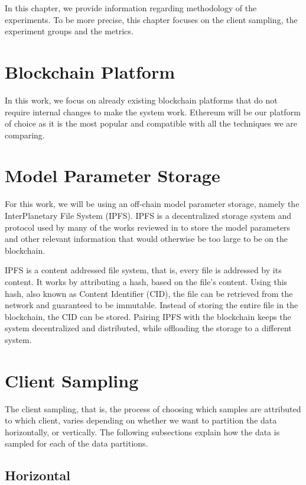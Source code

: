 In this chapter, we provide information regarding methodology of the experiments. To be more precise, this chapter focuses on the client sampling, the experiment groups and the metrics.

\section{Blockchain Platform}

In this work, we focus on already existing blockchain platforms that do not require internal changes to make the system work. Ethereum will be our platform of choice as it is the most popular and compatible with all the techniques we are comparing.

\section{Model Parameter Storage}\label{background:ipfs}

For this work, we will be using an off-chain model parameter storage, namely the InterPlanetary File System (IPFS). IPFS \cite{10.48550/arxiv.1407.3561} is a decentralized storage system and protocol used by many of the works reviewed in  to store the model parameters and other relevant information that would otherwise be too large to be on the blockchain.

IPFS is a content addressed file system, that is, every file is addressed by its content. It works by attributing a hash, based on the file's content. Using this hash, also known as Content Identifier (CID), the file can be retrieved from the network and guaranteed to be immutable. Instead of storing the entire file in the blockchain, the CID can be stored. Pairing IPFS with the blockchain keeps the system decentralized and distributed, while offloading the storage to a different system.


\section{Client Sampling}\label{meth:client_sampling}

The client sampling, that is, the process of choosing which samples are attributed to which client, varies depending on whether we want to partition the data horizontally, or vertically. The following subsections explain how the data is sampled for each of the data partitions.

\subsection{Horizontal}

